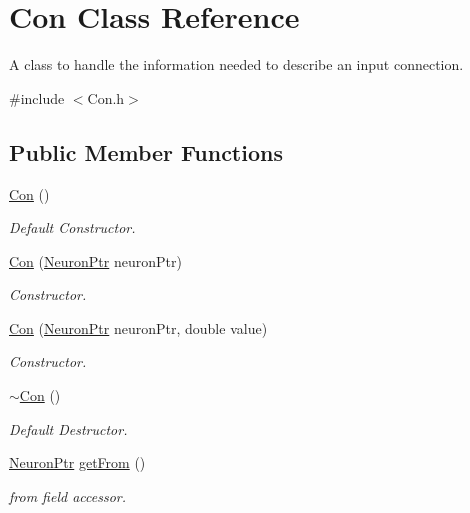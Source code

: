 \hypertarget{class_con}{
\section{Con Class Reference}
\label{class_con}
}


A class to handle the information needed to describe an input connection.  




{\ttfamily \#include $<$Con.h$>$}

\subsection*{Public Member Functions}
\begin{DoxyCompactItemize}
\item 
\hyperlink{class_con_a61621054cc1ee979385c81207ee0bceb}{Con} ()
\begin{DoxyCompactList}\small\item\em Default Constructor. \end{DoxyCompactList}\item 
\hyperlink{class_con_a9cebcd0e50b00f70e962997a8343cbb5}{Con} (\hyperlink{_a_m_o_r_e_8h_ac1ea936c2c7728eb382278131652fef4}{NeuronPtr} neuronPtr)
\begin{DoxyCompactList}\small\item\em Constructor. \end{DoxyCompactList}\item 
\hyperlink{class_con_a24c0cd2e7eea23c3a0c9435c6a238a14}{Con} (\hyperlink{_a_m_o_r_e_8h_ac1ea936c2c7728eb382278131652fef4}{NeuronPtr} neuronPtr, double value)
\begin{DoxyCompactList}\small\item\em Constructor. \end{DoxyCompactList}\item 
\hyperlink{class_con_a703b044611253c7a0a9e057ed62a3d22}{$\sim$Con} ()
\begin{DoxyCompactList}\small\item\em Default Destructor. \end{DoxyCompactList}\item 
\hyperlink{_a_m_o_r_e_8h_ac1ea936c2c7728eb382278131652fef4}{NeuronPtr} \hyperlink{class_con_a0c126eb4479324b156768e0810723423}{getFrom} ()
\begin{DoxyCompactList}\small\item\em from field accessor. \end{DoxyCompactList}\item 

\end{DoxyCompactItemize}
